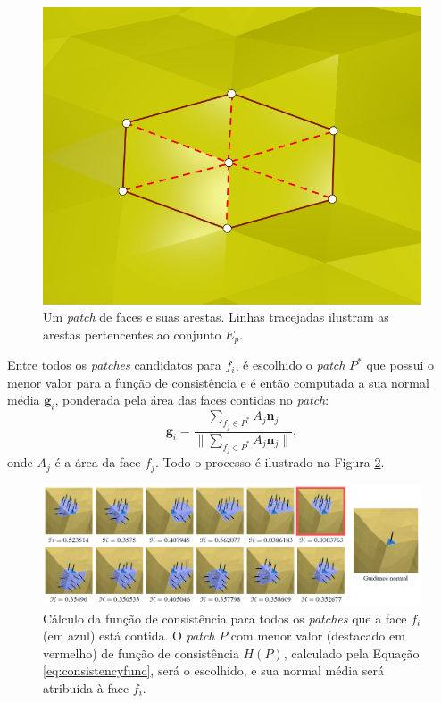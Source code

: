 \begin{figure}[!h]
\captionsetup{width=\linewidth}
\centering
\includegraphics[scale=0.30]{figuras/E_pEdges.png}
\caption{Um \textit{patch} de faces e suas arestas. Linhas tracejadas ilustram as arestas pertencentes ao conjunto $E_p$.}
\label{fig:epedges}
\end{figure}

Entre todos os \textit{patches} candidatos para $f_i$, é escolhido o \textit{patch} $P^*$ que possui o menor valor para a função de consistência e é então computada a sua normal média $\mathbf{g}_i$, ponderada pela área das faces contidas no \textit{patch}:
\begin{equation}
    \mathbf{g}_i = \frac{ \sum_{f_j \in P^*}{A_j\mathbf{n}_j} }{ \|\sum_{f_j \in P^*}{A_j\mathbf{n}_j}\| },
\end{equation}
onde $A_j$ é a área da face $f_j$. Todo o processo é ilustrado na Figura \ref{fig:guidedzangconsistencyfunction}.

\begin{figure}[!h]
\captionsetup{width=\linewidth}
\centering
\includegraphics[width=\linewidth]{figuras/guidedzangconsistencyfunction.png}
\caption{Cálculo da função de consistência para todos os \textit{patches} que a face $f_i$ (em azul) está contida. O \textit{patch} $P$ com menor valor (destacado em vermelho) de função de consistência $H(P)$, calculado pela Equação \ref{eq:consistencyfunc}, será o escolhido, e sua normal média será atribuída à face $f_i$.}
\label{fig:guidedzangconsistencyfunction}
\end{figure}


